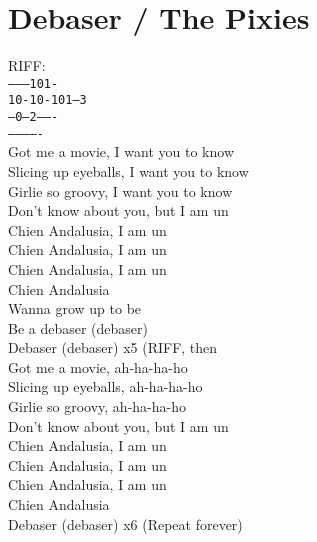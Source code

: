 \section{Debaser / The Pixies}\label{sec:debaser}

\Fmajor
\BflatMajor
\Gmajor
\Cmajor
\Dminor

RIFF:\\
\texttt{---------101-}\\
\texttt{10-10-101---3}\\
\texttt{--0--2-------}\\
\texttt{-------------}\\

 Got me a movie, I want you to know\\
Slicing up eyeballs, I want you to know\\
Girlie so groovy, I want you to know\\
Don't know about you, but I am un\\
Chien Andalusia, I am un\\
Chien Andalusia, I am un\\
Chien Andalusia, I am un\\
Chien Andalusia\\
Wanna grow up to be\\
Be a debaser    (debaser)\\
Debaser (debaser) x5 (RIFF, then         \\
 Got me a movie, ah-ha-ha-ho\\
Slicing up eyeballs, ah-ha-ha-ho\\
Girlie so groovy, ah-ha-ha-ho\\
Don't know about you, but I am un\\
Chien Andalusia, I am un\\
Chien Andalusia, I am un\\
Chien Andalusia, I am un\\
Chien Andalusia\\
Debaser (debaser) x6 (Repeat     forever)\\
